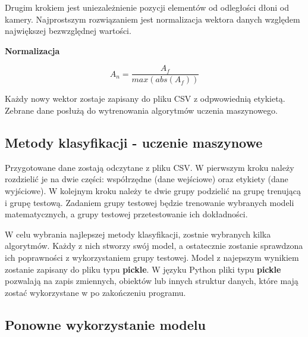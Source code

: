     
    \quad Drugim krokiem jest uniezależnienie pozycji elementów od odległości dłoni od kamery. Najprostszym rozwiązaniem jest normalizacja wektora danych względem największej bezwzględnej wartości. 
    
    \quad \textbf{Normalizacja}
    
    
    
    \begin{equation*}
        A_n=\dfrac{A_f}{max(abs(A_f))}
    \end{equation*}
    
    \quad Każdy nowy wektor zostaje zapisany do pliku CSV z odpwowiednią etykietą. Zebrane dane posłużą do wytrenowania algorytmów uczenia maszynowego. 
    
    
    
    \subsection{Metody klasyfikacji - uczenie maszynowe}
    
    \quad Przygotowane dane zostają odczytane z pliku CSV. W pierwszym kroku należy rozdzielić je na dwie części: współrzędne (dane wejściowe) oraz etykiety (dane wyjściowe). W kolejnym kroku należy te dwie grupy podzielić na grupę trenującą i grupę testową. Zadaniem grupy testowej będzie trenowanie wybranych modeli matematycznych, a grupy testowej przetestowanie ich dokładności. 
    
    \quad W celu wybrania najlepszej metody klasyfikacji, zostnie wybranych kilka algorytmów. Każdy z nich stworzy swój model, a ostatecznie zostanie sprawdzona ich poprawności z wykorzystaniem grupy testowej. Model z najepszym wynikiem zostanie zapisany do pliku typu \textbf{pickle}. W języku Python pliki typu \textbf{pickle} pozwalają na zapis zmiennych, obiektów lub innych struktur danych, które mają zostać wykorzystane w po zakończeniu programu. 
    
    \subsection{Ponowne wykorzystanie modelu}
    
